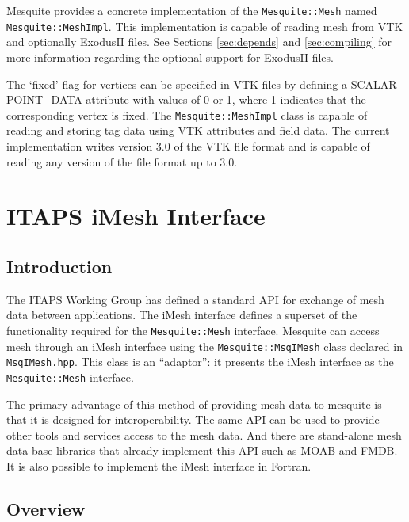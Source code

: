 Mesquite provides a concrete implementation of the \texttt{Mesquite::Mesh} named
\texttt{Mesquite::MeshImpl}.  This implementation is capable of reading mesh from
VTK\cite{VTKbook, VTKuml} and optionally ExodusII files. See Sections 
\ref{sec:depends} and \ref{sec:compiling} for more 
information regarding the optional support for ExodusII files.

The `fixed' flag for vertices can be specified in VTK files by defining a
SCALAR POINT\_DATA attribute with values of 0 or 1, where 1 indicates that the
corresponding vertex is fixed.  The \texttt{Mesquite::MeshImpl} class is capable
of reading and storing tag data 
using VTK attributes and
field data.  The current implementation writes version 3.0 of the VTK file format
and is capable of reading any version of the file format up to 3.0.  



\section{ITAPS iMesh Interface}

\subsection{Introduction}

The ITAPS Working Group has defined a standard API for exchange of mesh data between applications.  The iMesh interface\cite{imesh} defines a superset of the functionality required for the \texttt{Mesquite::Mesh} interface.  Mesquite can access mesh through an iMesh interface using the \texttt{Mesquite::MsqIMesh} class declared in \texttt{MsqIMesh.hpp}.  This class is an ``adaptor'':  it presents the iMesh interface as the \texttt{Mesquite::Mesh} interface.  

The primary advantage of this method of providing mesh data to mesquite is that it is designed for interoperability.  The same API can be used to provide other tools and services access to the mesh data.  And there are stand-alone mesh data base libraries that already implement this API such as MOAB\cite{MOAB-webpage} and FMDB\cite{FMDB-webpage}.  It is also possible to implement the iMesh interface in Fortran.

\subsection{Overview}

